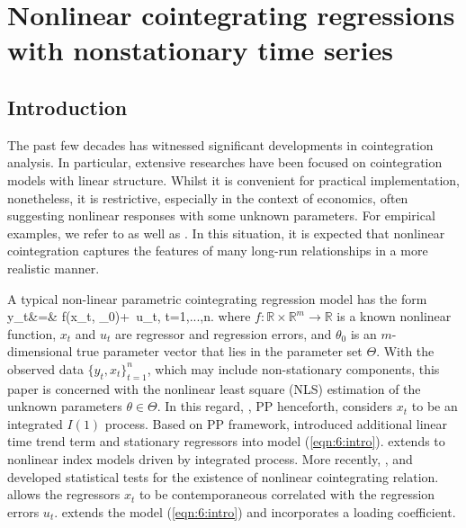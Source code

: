 
\chapter{Nonlinear cointegrating regressions with nonstationary time series}
\ifpdf
    \graphicspath{{Chapter6/Chapter6Figs/PNG/}{Chapter6/Chapter6Figs/PDF/}{Chapter6/Chapter6Figs/}}
\else
    \graphicspath{{Chapter6/Chapter6Figs/EPS/}{Chapter6/Chapter6Figs/}}
\fi

\section{Introduction}
The past few decades has witnessed significant developments in cointegration analysis.
 In particular, extensive researches  have been focused on cointegration models with linear structure. Whilst it is convenient for practical implementation, nonetheless, it is restrictive, especially in the context of economics, often suggesting nonlinear responses with some unknown parameters.
For empirical examples, we refer to   \cite{grangerterasvirta1993} as well as \cite{terasvirtatjostheimgranger2010}. In this situation, it is expected that nonlinear cointegration captures the features of many long-run relationships
in a more realistic manner.

A typical non-linear parametric cointegrating regression model has the form
\be
  y_t&=& f(x_t, \theta_0)+\,  u_t, \quad t=1,...,n.
\ee
where  $f:\mathbb{R} \times \mathbb{R}^m \rightarrow \mathbb{R}$ is a known nonlinear function, $x_t$ and  $u_t$ are regressor and regression errors, and   $\theta_0$ is an $m$-dimensional true parameter vector that lies in the parameter set $\Theta$. With the observed data $\{y_t, x_t\}_{t=1}^n$, which may include non-stationary components, this paper is concerned with the nonlinear least square (NLS) estimation of the unknown parameters $\theta\in \Theta$. In this regard, \cite[][\citeyear{parkphillips2001}]{parkphillips1999}, PP henceforth, considers $x_t$ to be an integrated $I(1)$ process. Based on PP framework, \cite{changparkphillips2001} introduced additional linear time trend term and stationary regressors into model (\ref{eqn:6:intro}). \cite{changpark2003} extends to nonlinear index models driven by integrated process.  More recently, \cite{choisaikkonen2010}, \cite{gaokinglutjostheim2009} and \cite{wangphillips2012} developed statistical tests  for the existence of nonlinear cointegrating relation. \cite{changpark2010} allows the regressors $x_t$ to be contemporaneous correlated with the regression errors $u_t$. \cite{shiphillips2010} extends the model (\ref{eqn:6:intro}) and incorporates a loading coefficient.



